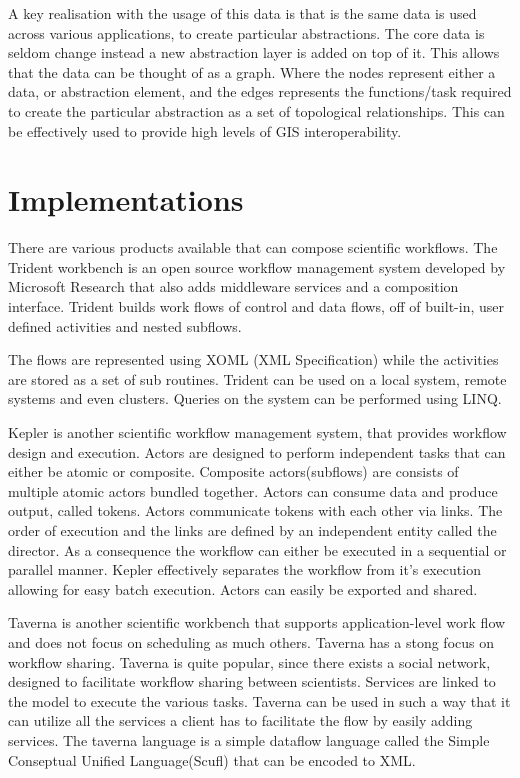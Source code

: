 \documentclass[11pt,twocolumn]{article}
\begin{document}
    A key realisation with the usage of this data is that
    is the same data is used across various applications,
    to create particular abstractions. The core data is
    seldom change instead a new abstraction layer is added
    on top of it. This allows that the data can be thought
    of as a graph. Where the nodes represent either a data,
    or abstraction element, and the edges represents the
    functions/task required to create the particular abstraction
    as a set of topological
    relationships. This can be effectively used to provide
    high levels of GIS
    interoperability\cite{ElAdnani:2001:MLF:512161.512177}.

\section{Implementations}
    There are various products available that can compose
    scientific workflows. The Trident workbench
    \cite{Simmhan:2009:BTS:1673063.1673121} is an open
    source workflow management system developed by Microsoft
    Research that also adds middleware services and a
    composition interface. Trident builds work flows of control
    and data flows, off of built-in, user defined activities and
    nested subflows.

    The flows are represented using XOML (XML Specification) while
    the activities are stored as a set of sub routines. Trident
    can be used on a local system, remote systems and even clusters.
    Queries on the system can be performed using LINQ.
    \cite{Simmhan2011790}

    Kepler is another scientific workflow management system, that
    provides workflow design and execution. Actors are designed
    to perform independent tasks that can either be atomic or
    composite. Composite actors(subflows) are consists of multiple
    atomic actors bundled together. Actors can consume data and
    produce output, called tokens. Actors communicate tokens with
    each other via links. The order of execution and the links are
    defined by an independent entity called the director. As a
    consequence the workflow can either be executed in a
    sequential or parallel manner. Kepler effectively separates
    the workflow from it's execution allowing for easy batch
    execution. Actors can easily be exported and shared.
    \cite{Wang:2009:KHG:1645164.1645176}

    Taverna is another scientific workbench that supports
    application-level work flow and does not focus on scheduling
    as much others. Taverna has a stong focus on workflow
    sharing. Taverna is quite popular, since there exists
    a social network, designed to facilitate workflow sharing
    between scientists. Services are linked to the model to
    execute the various tasks. Taverna can be used in such
    a way that it can utilize all the services a client has
    to facilitate the flow by easily adding services. The
    taverna language is a simple dataflow language called
    the Simple Conseptual Unified Language(Scufl) that can
    be encoded to XML. \cite{4721191}
\end{document}
